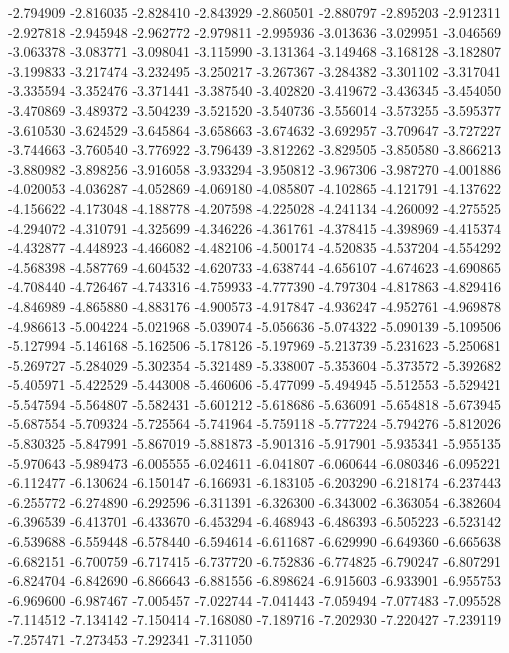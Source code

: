 -2.794909
-2.816035
-2.828410
-2.843929
-2.860501
-2.880797
-2.895203
-2.912311
-2.927818
-2.945948
-2.962772
-2.979811
-2.995936
-3.013636
-3.029951
-3.046569
-3.063378
-3.083771
-3.098041
-3.115990
-3.131364
-3.149468
-3.168128
-3.182807
-3.199833
-3.217474
-3.232495
-3.250217
-3.267367
-3.284382
-3.301102
-3.317041
-3.335594
-3.352476
-3.371441
-3.387540
-3.402820
-3.419672
-3.436345
-3.454050
-3.470869
-3.489372
-3.504239
-3.521520
-3.540736
-3.556014
-3.573255
-3.595377
-3.610530
-3.624529
-3.645864
-3.658663
-3.674632
-3.692957
-3.709647
-3.727227
-3.744663
-3.760540
-3.776922
-3.796439
-3.812262
-3.829505
-3.850580
-3.866213
-3.880982
-3.898256
-3.916058
-3.933294
-3.950812
-3.967306
-3.987270
-4.001886
-4.020053
-4.036287
-4.052869
-4.069180
-4.085807
-4.102865
-4.121791
-4.137622
-4.156622
-4.173048
-4.188778
-4.207598
-4.225028
-4.241134
-4.260092
-4.275525
-4.294072
-4.310791
-4.325699
-4.346226
-4.361761
-4.378415
-4.398969
-4.415374
-4.432877
-4.448923
-4.466082
-4.482106
-4.500174
-4.520835
-4.537204
-4.554292
-4.568398
-4.587769
-4.604532
-4.620733
-4.638744
-4.656107
-4.674623
-4.690865
-4.708440
-4.726467
-4.743316
-4.759933
-4.777390
-4.797304
-4.817863
-4.829416
-4.846989
-4.865880
-4.883176
-4.900573
-4.917847
-4.936247
-4.952761
-4.969878
-4.986613
-5.004224
-5.021968
-5.039074
-5.056636
-5.074322
-5.090139
-5.109506
-5.127994
-5.146168
-5.162506
-5.178126
-5.197969
-5.213739
-5.231623
-5.250681
-5.269727
-5.284029
-5.302354
-5.321489
-5.338007
-5.353604
-5.373572
-5.392682
-5.405971
-5.422529
-5.443008
-5.460606
-5.477099
-5.494945
-5.512553
-5.529421
-5.547594
-5.564807
-5.582431
-5.601212
-5.618686
-5.636091
-5.654818
-5.673945
-5.687554
-5.709324
-5.725564
-5.741964
-5.759118
-5.777224
-5.794276
-5.812026
-5.830325
-5.847991
-5.867019
-5.881873
-5.901316
-5.917901
-5.935341
-5.955135
-5.970643
-5.989473
-6.005555
-6.024611
-6.041807
-6.060644
-6.080346
-6.095221
-6.112477
-6.130624
-6.150147
-6.166931
-6.183105
-6.203290
-6.218174
-6.237443
-6.255772
-6.274890
-6.292596
-6.311391
-6.326300
-6.343002
-6.363054
-6.382604
-6.396539
-6.413701
-6.433670
-6.453294
-6.468943
-6.486393
-6.505223
-6.523142
-6.539688
-6.559448
-6.578440
-6.594614
-6.611687
-6.629990
-6.649360
-6.665638
-6.682151
-6.700759
-6.717415
-6.737720
-6.752836
-6.774825
-6.790247
-6.807291
-6.824704
-6.842690
-6.866643
-6.881556
-6.898624
-6.915603
-6.933901
-6.955753
-6.969600
-6.987467
-7.005457
-7.022744
-7.041443
-7.059494
-7.077483
-7.095528
-7.114512
-7.134142
-7.150414
-7.168080
-7.189716
-7.202930
-7.220427
-7.239119
-7.257471
-7.273453
-7.292341
-7.311050
